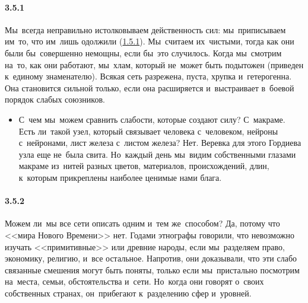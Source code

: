 \paragraph{3.5.1}\hypertarget{par:3.5.1}{} Мы~всегда неправильно истолковываем действенность сил: мы~приписываем им~то, что им~лишь одолжили (\hyperlink{par:1.5.1}{1.5.1}). Мы~считаем их~чистыми, тогда как они были бы~совершенно немощны, если бы~это случилось. Когда мы~смотрим на~то, как они работают, мы~хлам, который не~может быть подытожен (приведен к~единому знаменателю). Всякая сеть разрежена, пуста, хрупка и~гетерогенна. Она становится сильной только, если она расширяется и~выстраивает в~боевой порядок слабых союзников. 
	\begin{itemize}
	\item 
 С~чем мы~можем сравнить слабости, которые создают силу? С~макраме. Есть ли~такой узел, который связывает человека с~человеком, нейроны с~нейронами, лист железа с~листом железа? Нет. Веревка для этого Гордиева узла еще не~была свита. Но~каждый день мы~видим собственными глазами макраме из~нитей разных цветов, материалов, происхождений, длин, к~которым прикреплены наиболее ценимые нами блага.
	\end{itemize}

\paragraph{3.5.2}\hypertarget{par:3.5.2}{} Можем ли~мы все сети описать одним и~тем же~способом? Да, потому что <<мира Нового Времени>> нет.
Годами этнографы говорили, что невозможно изучать <<примитивные>> или древние народы, если мы~разделяем право, экономику, религию, и~все остальное. Напротив, они доказывали, что эти слабо связанные смешения могут быть поняты, только если мы~пристально посмотрим на~места, семьи, обстоятельства и~сети. Но~когда они говорят о~своих собственных странах, он~прибегают к~разделению сфер и~уровней.
 

